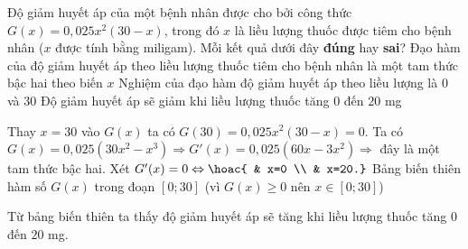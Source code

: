 \begin{ex}%
Độ giảm huyết áp của một bệnh nhân được cho bởi công thức $G(x)=0{,}025x^2(30-x)$, trong đó $x$ là liều lượng thuốc được tiêm cho bệnh nhân ($x$ được tính bằng miligam). Mỗi kết quả dưới đây \textbf{đúng} hay \textbf{sai}?
{\True Đạo hàm của độ giảm huyết áp theo liều lượng thuốc tiêm cho bệnh nhân là một tam thức bậc hai theo biến $x$}
{Nghiệm của đạo hàm độ giảm huyết áp theo liều lượng là $0$ và $30$}
{Độ giảm huyết áp sẽ giảm khi liều lượng thuốc tăng $0$ đến $20$ mg}
\loigiai
{
\begin{itemchoice}
\itemch Thay $x=30$ vào $G(x)$ ta có $G(30)=0{,}025x^2(30-x)=0$.
\itemch Ta có $G(x)=0{,}025\left(30x^2-x^3\right) \Rightarrow G'(x)=0{,}025\left(60x-3x^2\right) \Rightarrow$ đây là một tam thức bậc hai.
\itemch Xét $G'(x)=0 \Leftrightarrow \hoac{ & x=0 \\ & x=20.}$
\itemch Bảng biến thiên hàm số $G(x)$ trong đoạn $[0;30]$ (vì $G(x)\ge 0$ nên $x\in [0;30]$)
\begin{center}
\end{center}
Từ bảng biến thiên ta thấy độ giảm huyết áp sẽ tăng khi liều lượng thuốc tăng $0$ đến $20$ mg.
\end{itemchoice}
}
\end{ex}

